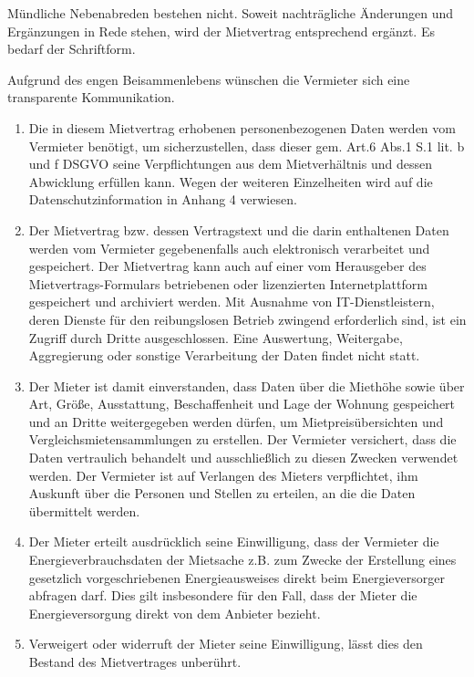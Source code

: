 \documentclass{scrreprt}[12pt,a4paper,twoside,duplex]
\begin{document}
\begin{contract}
	Mündliche Nebenabreden bestehen nicht. Soweit nachträgliche Änderungen und Ergänzungen in Rede stehen, wird der Mietvertrag entsprechend ergänzt. Es bedarf der Schriftform.
\end{contract}

\begin{contract}
	Aufgrund des engen Beisammenlebens wünschen die Vermieter sich eine transparente Kommunikation.
\end{contract}

\begin{contract}
	\begin{enumerate}
		\item Die in diesem Mietvertrag erhobenen personenbezogenen Daten werden vom Vermieter benötigt, um sicherzustellen, dass dieser gem. Art.6 Abs.1 S.1 lit. b und f DSGVO seine Verpflichtungen aus dem Mietverhältnis und dessen Abwicklung erfüllen kann. Wegen der weiteren Einzelheiten wird auf die Datenschutzinformation in Anhang 4 verwiesen.
		\item Der Mietvertrag bzw. dessen Vertragstext und die darin enthaltenen Daten werden vom Vermieter gegebenenfalls auch elektronisch verarbeitet und gespeichert. Der Mietvertrag kann auch auf einer vom Herausgeber des Mietvertrags-Formulars betriebenen oder lizenzierten Internetplattform gespeichert und archiviert werden. Mit Ausnahme von IT-Dienstleistern, deren Dienste für den reibungslosen Betrieb zwingend erforderlich sind, ist ein Zugriff durch Dritte ausgeschlossen. Eine Auswertung, Weitergabe, Aggregierung oder sonstige Verarbeitung der Daten findet nicht statt.
		\item Der Mieter ist damit einverstanden, dass Daten über die Miethöhe sowie über Art, Größe, Ausstattung, Beschaffenheit und Lage der Wohnung gespeichert und an Dritte weitergegeben werden dürfen, um Mietpreisübersichten und Vergleichsmietensammlungen zu erstellen. Der Vermieter versichert, dass die Daten vertraulich behandelt und ausschließlich zu diesen Zwecken verwendet werden. Der Vermieter ist auf Verlangen des Mieters verpflichtet, ihm Auskunft über die Personen und Stellen zu erteilen, an die die Daten übermittelt werden.
		\item Der Mieter erteilt ausdrücklich seine Einwilligung, dass der Vermieter die Energieverbrauchsdaten der Mietsache z.B. zum Zwecke der Erstellung eines gesetzlich vorgeschriebenen Energieausweises direkt beim Energieversorger abfragen darf. Dies gilt insbesondere für den Fall, dass der Mieter die Energieversorgung direkt von dem Anbieter bezieht.
		\item Verweigert oder widerruft der Mieter seine Einwilligung, lässt dies den Bestand des Mietvertrages unberührt.
	\end{enumerate}
\end{contract}
\end{document}
